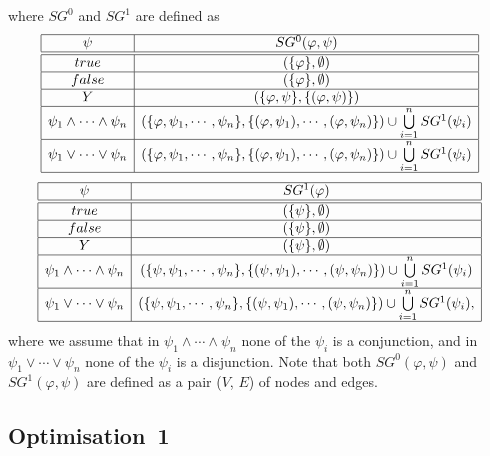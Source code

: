 \documentclass{article}
\begin{document}
where $SG^{0}$ and $SG^{1}$ are defined as%
\begin{equation*}
\begin{array}{|c|c|}
\hline
\psi  & SG^{0}(\varphi ,\psi ) \\ \hline\hline
true & (\{\varphi \},\emptyset ) \\ \hline
false & (\{\varphi \},\emptyset ) \\ \hline
Y & (\{\varphi ,\psi \},\{(\varphi ,\psi )\}) \\ \hline
\psi _{1}\wedge \cdots \wedge \psi _{n} & \left( \{\varphi ,\psi _{1},\cdots
,\psi _{n}\},\{(\varphi ,\psi _{1}),\cdots ,(\varphi ,\psi _{n})\}\right)
\cup \bigcup\limits_{i=1}^{n}SG^{1}(\psi _{i}) \\ \hline
\psi _{1}\vee \cdots \vee \psi _{n} & \left( \{\varphi ,\psi _{1},\cdots
,\psi _{n}\},\{(\varphi ,\psi _{1}),\cdots ,(\varphi ,\psi _{n})\}\right)
\cup \bigcup\limits_{i=1}^{n}SG^{1}(\psi _{i}) \\ \hline
\end{array}%
\end{equation*}%
\begin{equation*}
\begin{array}{|c|c|}
\hline
\psi  & SG^{1}(\varphi ) \\ \hline\hline
true & (\{\psi \},\emptyset ) \\ \hline
false & (\{\psi \},\emptyset ) \\ \hline
Y & (\{\psi \},\emptyset ) \\ \hline
\psi _{1}\wedge \cdots \wedge \psi _{n} & \left( \{\psi ,\psi _{1},\cdots
,\psi _{n}\},\{(\psi ,\psi _{1}),\cdots ,(\psi ,\psi _{n})\}\right) \cup
\bigcup\limits_{i=1}^{n}SG^{1}(\psi _{i}) \\ \hline
\psi _{1}\vee \cdots \vee \psi _{n} & \left( \{\psi ,\psi _{1},\cdots ,\psi
_{n}\},\{(\psi ,\psi _{1}),\cdots ,(\psi ,\psi _{n})\}\right) \cup
\bigcup\limits_{i=1}^{n}SG^{1}(\psi _{i}), \\ \hline
\end{array}%
\end{equation*}%
where we assume that in $\psi _{1}\wedge \cdots \wedge \psi _{n}$ none of
the $\psi _{i}$ is a conjunction, and in $\psi _{1}\vee \cdots \vee \psi _{n}
$ none of the $\psi _{i}$ is a disjunction. Note that both $SG^{0}(\varphi
,\psi )$ and $SG^{1}(\varphi ,\psi )$ are defined as a pair ($V$, $E$) of
nodes and edges.

\subsection{Optimisation~1}
\end{document}
